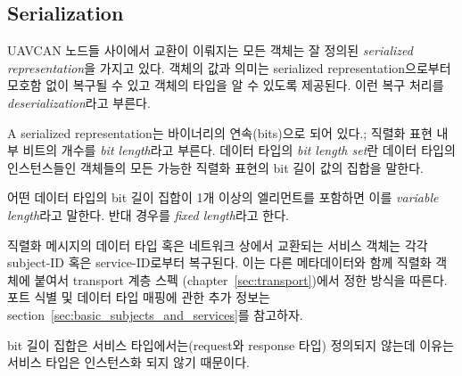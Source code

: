 \subsection{Serialization}

UAVCAN 노드들 사이에서 교환이 이뤄지는 모든 객체는 잘 정의된 \emph{serialized representation}을 가지고 있다.
객체의 값과 의미는 serialized representation으로부터 모호함 없이 복구될 수 있고 객체의 타입을 알 수 있도록 제공된다.
이런 복구 처리를 \emph{deserialization}라고 부른다.

\label{sec:dsdl_bit_length_set}
A serialized representation는 바이너리의 연속(bits)으로 되어 있다.;
직렬화 표현 내부 비트의 개수를 \emph{bit length}라고 부른다.
데이터 타입의 \emph{bit length set}란 데이터 타입의 인스턴스들인 객체들의 모든 가능한 직렬화 표현의 bit 길이 값의 집합을 말한다.

어떤 데이터 타입의 bit 길이 집합이 1개 이상의 엘리먼트를 포함하면 이를 \emph{variable length}라고 말한다.
반대 경우를 \emph{fixed length}라고 한다.

직렬화 메시지의 데이터 타입 혹은 네트워크 상에서 교환되는 서비스 객체는 각각 subject-ID 혹은 service-ID로부터 복구된다.
이는 다른 메타데이터와 함께 직렬화 객체에 붙여서 transport 계층 스펙 (chapter~\ref{sec:transport})에서 정한 방식을 따른다.
포트 식별 및 데이터 타입 매핑에 관한 추가 정보는 section~\ref{sec:basic_subjects_and_services}를 참고하자.

bit 길이 집합은 서비스 타입에서는(request와 response 타입) 정의되지 않는데 이유는 서비스 타입은 인스턴스화 되지 않기 때문이다.